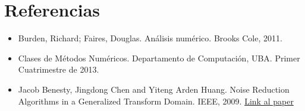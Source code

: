 \section{Referencias}

\begin{itemize}
  \item \nocite {Burden} Burden, Richard; Faires, Douglas. An\'alisis 
num\'erico. Brooks Cole, 2011.
  \item \nocite {MN} Clases de M\'etodos Num\'ericos. Departamento de 
Computaci\'on, UBA. Primer Cuatrimestre de 2013.
\item \nocite {MN} Jacob Benesty, Jingdong Chen and Yiteng Arden Huang. Noise Reduction Algorithms in a Generalized Transform Domain.
IEEE, 2009.
\href{http://externe.emt.inrs.ca/users/benesty/papers/aslp_aug2009.pdf}{Link al
paper}
\end{itemize}
